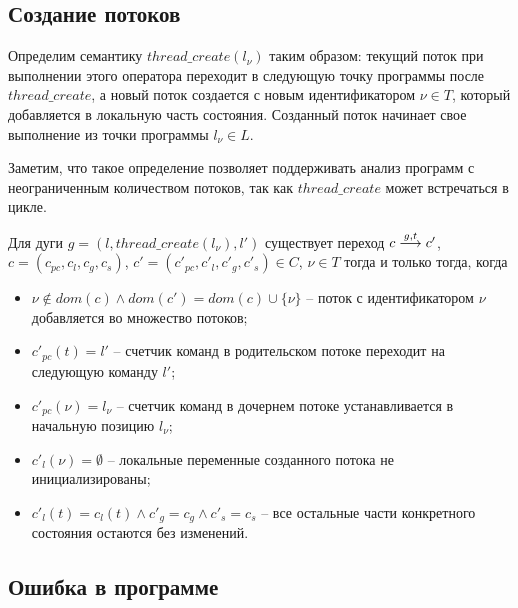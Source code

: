 \subsection{Создание потоков}
Определим семантику $thread\_create(l_\nu)$ таким образом: текущий поток при выполнении этого оператора переходит в следующую точку программы после $thread\_create$, а новый поток создается с новым идентификатором $\nu \in T$, который добавляется в локальную часть состояния.
Созданный поток начинает свое выполнение из точки программы $l_\nu \in L$.

Заметим, что такое определение позволяет поддерживать анализ программ с неограниченным количеством потоков, так как $thread\_create$ может встречаться в цикле.

Для дуги $g = (l, thread\_create(l_\nu), l')$ существует переход
$c \stackrel{g, t}{\longrightarrow} c'$, $c=(c_{pc}, c_l, c_g, c_s)$, $c'=(c'_{pc}, c'_l, c'_g, c'_s) \in C$, $\nu \in T$ тогда и только тогда, когда
\begin{itemize}
\item $\nu \notin dom(c) \land dom(c') = dom(c) \cup \{ \nu\}$ -- поток с идентификатором $\nu$ добавляется во множество потоков;
\item $c'_{pc}(t)=l'$ -- счетчик команд в родительском потоке переходит на следующую команду $l'$;
\item $c'_{pc}(\nu)=l_\nu$ --  счетчик команд в дочернем потоке устанавливается в начальную позицию $l_\nu$;
\item $c'_l(\nu)=\emptyset$ -- локальные переменные созданного потока не инициализированы;
\item $c'_l(t)=c_l(t) \land c'_g = c_g \land c'_s = c_s$ -- все остальные части конкретного состояния остаются без изменений.
\end{itemize}



\subsection{Ошибка в программе}


